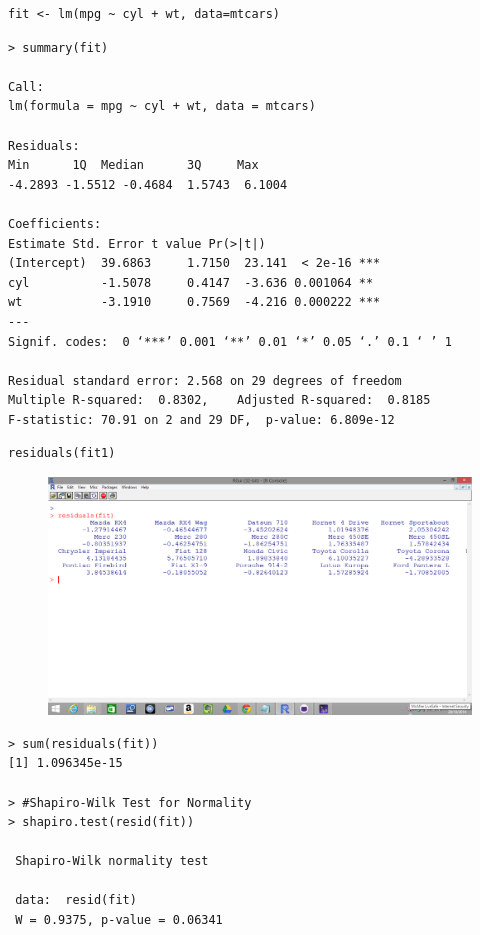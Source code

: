 \documentclass[residuals.tex]{subfiles}
\begin{document}
\begin{framed}
\begin{verbatim}
fit <- lm(mpg ~ cyl + wt, data=mtcars)
\end{verbatim}
\end{framed}
\newpage
\begin{verbatim}
> summary(fit)

Call:
lm(formula = mpg ~ cyl + wt, data = mtcars)

Residuals:
Min      1Q  Median      3Q     Max 
-4.2893 -1.5512 -0.4684  1.5743  6.1004 

Coefficients:
Estimate Std. Error t value Pr(>|t|)    
(Intercept)  39.6863     1.7150  23.141  < 2e-16 ***
cyl          -1.5078     0.4147  -3.636 0.001064 ** 
wt           -3.1910     0.7569  -4.216 0.000222 ***
---
Signif. codes:  0 ‘***’ 0.001 ‘**’ 0.01 ‘*’ 0.05 ‘.’ 0.1 ‘ ’ 1

Residual standard error: 2.568 on 29 degrees of freedom
Multiple R-squared:  0.8302,    Adjusted R-squared:  0.8185 
F-statistic: 70.91 on 2 and 29 DF,  p-value: 6.809e-12
\end{verbatim}
\newpage
\begin{framed}
\begin{verbatim}
residuals(fit1)
\end{verbatim}
\end{framed}
\begin{figure}[h!]
\centering
\includegraphics[width=0.9\linewidth]{screenshot1}
\caption{}
\label{fig:screenshot1}
\end{figure}
\begin{verbatim}
> sum(residuals(fit))
[1] 1.096345e-15

> #Shapiro-Wilk Test for Normality
> shapiro.test(resid(fit))
 
 Shapiro-Wilk normality test
 
 data:  resid(fit)
 W = 0.9375, p-value = 0.06341
 
 
\end{verbatim}
\end{document}
